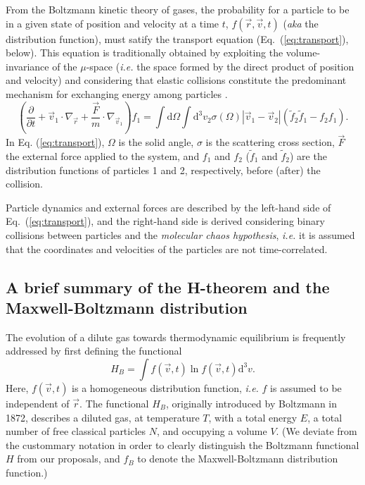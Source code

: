 From the Boltzmann kinetic theory of gases, the probability for a particle to be in a given
state of position and velocity at a time $t$,
$f(\vec r,\vec v,t)$ (\textit{aka} the distribution function), must satify
the transport equation (Eq.~(\ref{eq:transport}), below).
This equation is traditionally obtained by exploiting the volume-invariance of the $\mu$-space
(\textit{i.e.} the space formed by the direct product of position and velocity)
and considering that elastic collisions constitute the predominant mechanism
for exchanging energy among particles \cite{bib:huang}.
%
\begin{equation}\label{eq:transport}
  \left(
    \frac{\partial}{\partial t}+\vec{v}_1 \cdot\nabla_{\vec r}
    +\frac{\vec{F}}{m}\cdot\nabla_{\vec v_1}
  \right)f_1=\int\mathrm{d}\Omega\int
    \mathrm{d}^{3}v_2\sigma(\Omega)|\vec{v}_1-\vec{v}_2|(\tilde f_2\tilde f_1-f_2f_1).
\end{equation}
%
In Eq. (\ref{eq:transport}), $\Omega$ is the solid angle, $\sigma$ is the
scattering cross section, $\vec F$ the
external force applied to the system, and $f_1$ and $f_2$ ($\tilde f_1$ and $\tilde f_2$) are the distribution
functions of particles 1 and 2, respectively, before (after) the collision.

Particle dynamics and external forces are described
by the left-hand side of Eq.~(\ref{eq:transport}), and the right-hand side
is derived considering binary collisions between particles and
the \textit{molecular chaos hypothesis}, \textit{i.e.} it is assumed that
the coordinates and velocities of the particles are not time-correlated.


\subsection{A brief summary of the H-theorem and the Maxwell-Boltzmann distribution}

The evolution of a dilute gas towards thermodynamic equilibrium is frequently
addressed by first defining the functional \cite{bib:tolman,bib:huang}
%
\begin{equation}\label{eq:hbfunctional}
   H_{B}=\int f(\vec{v},t) \ln f(\vec{v},t) \mathrm{d}^{3}v.
\end{equation} 
%
Here, $f(\vec{v},t)$ is a homogeneous distribution function, \textit{i.e.}
$f$ is assumed to be independent of $\vec r$.
The functional $H_B$,
originally introduced by Boltzmann in 1872,
describes a diluted gas, at temperature $T$, with a total energy $E$, a total
number of free classical particles $N$, and occupying a volume $V$.
(We deviate from the custommary notation in order to
clearly distinguish the Boltzmann functional $H$ from our proposals, and
$f_B$ to denote the Maxwell-Boltzmann distribution function.)

